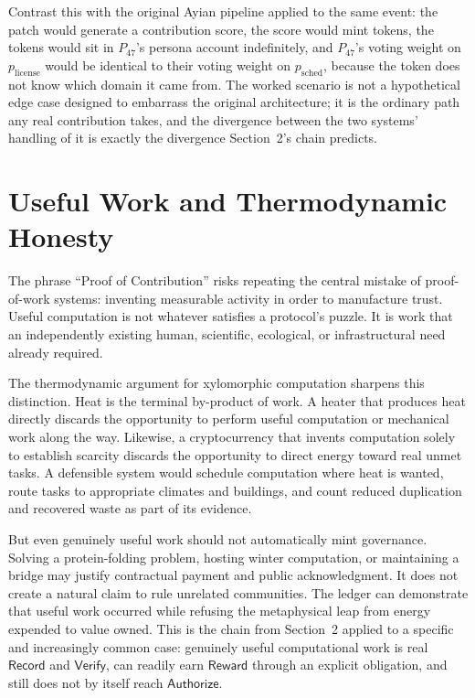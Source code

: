 \documentclass[11pt,oneside]{article}
\theoremstyle{plain}
\theoremstyle{definition}
\newcommand{\Record}{\mathsf{Record}}
\newcommand{\Verify}{\mathsf{Verify}}
\newcommand{\Reward}{\mathsf{Reward}}
\newcommand{\Authorize}{\mathsf{Authorize}}
\begin{document}
Contrast this with the original Ayian pipeline applied to the same event: the patch would generate a contribution score, the score would mint tokens, the tokens would sit in $P_{47}$'s persona account indefinitely, and $P_{47}$'s voting weight on $p_{\text{license}}$ would be identical to their voting weight on $p_{\text{sched}}$, because the token does not know which domain it came from. The worked scenario is not a hypothetical edge case designed to embarrass the original architecture; it is the ordinary path any real contribution takes, and the divergence between the two systems' handling of it is exactly the divergence Section~2's chain predicts.

\section{Useful Work and Thermodynamic Honesty}

The phrase \enquote{Proof of Contribution} risks repeating the central mistake of proof-of-work systems: inventing measurable activity in order to manufacture trust. Useful computation is not whatever satisfies a protocol's puzzle. It is work that an independently existing human, scientific, ecological, or infrastructural need already required.

The thermodynamic argument for xylomorphic computation sharpens this distinction. Heat is the terminal by-product of work. A heater that produces heat directly discards the opportunity to perform useful computation or mechanical work along the way. Likewise, a cryptocurrency that invents computation solely to establish scarcity discards the opportunity to direct energy toward real unmet tasks. A defensible system would schedule computation where heat is wanted, route tasks to appropriate climates and buildings, and count reduced duplication and recovered waste as part of its evidence.

But even genuinely useful work should not automatically mint governance. Solving a protein-folding problem, hosting winter computation, or maintaining a bridge may justify contractual payment and public acknowledgment. It does not create a natural claim to rule unrelated communities. The ledger can demonstrate that useful work occurred while refusing the metaphysical leap from energy expended to value owned. This is the chain from Section~2 applied to a specific and increasingly common case: genuinely useful computational work is real $\Record$ and $\Verify$, can readily earn $\Reward$ through an explicit obligation, and still does not by itself reach $\Authorize$.
\end{document}
